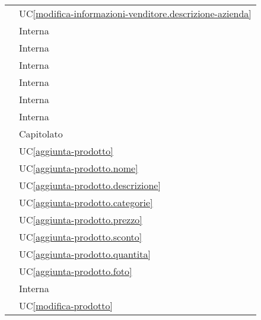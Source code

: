 \begin{longtable}{C{6cm} C{6cm}}
     & UC\ref{modifica-informazioni-venditore.descrizione-azienda} \\

     & Interna \\
        
     & Interna \\ 

     & Interna \\

     & Interna \\

     & Interna \\

     & Interna \\

     & Capitolato \\

     & UC\ref{aggiunta-prodotto} \\
        
     & UC\ref{aggiunta-prodotto.nome} \\
        
     & UC\ref{aggiunta-prodotto.descrizione} \\
        
     & UC\ref{aggiunta-prodotto.categorie} \\
        
     & UC\ref{aggiunta-prodotto.prezzo} \\
        
     & UC\ref{aggiunta-prodotto.sconto} \\
        
     & UC\ref{aggiunta-prodotto.quantita} \\
        
     & UC\ref{aggiunta-prodotto.foto} \\
        
     & Interna \\
        
     & UC\ref{modifica-prodotto} \\
        

\end{longtable}
